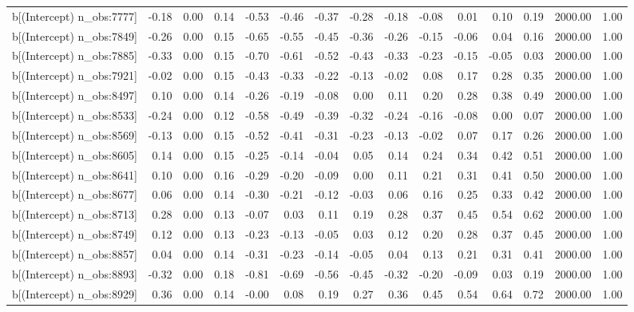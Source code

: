 \begin{table}[ht]
\begin{tabular}{rrrrrrrrrrrrrrr}
  b[(Intercept) n\_obs:7777] & -0.18 & 0.00 & 0.14 & -0.53 & -0.46 & -0.37 & -0.28 & -0.18 & -0.08 & 0.01 & 0.10 & 0.19 & 2000.00 & 1.00 \\ 
  b[(Intercept) n\_obs:7849] & -0.26 & 0.00 & 0.15 & -0.65 & -0.55 & -0.45 & -0.36 & -0.26 & -0.15 & -0.06 & 0.04 & 0.16 & 2000.00 & 1.00 \\ 
  b[(Intercept) n\_obs:7885] & -0.33 & 0.00 & 0.15 & -0.70 & -0.61 & -0.52 & -0.43 & -0.33 & -0.23 & -0.15 & -0.05 & 0.03 & 2000.00 & 1.00 \\ 
  b[(Intercept) n\_obs:7921] & -0.02 & 0.00 & 0.15 & -0.43 & -0.33 & -0.22 & -0.13 & -0.02 & 0.08 & 0.17 & 0.28 & 0.35 & 2000.00 & 1.00 \\ 
  b[(Intercept) n\_obs:8497] & 0.10 & 0.00 & 0.14 & -0.26 & -0.19 & -0.08 & 0.00 & 0.11 & 0.20 & 0.28 & 0.38 & 0.49 & 2000.00 & 1.00 \\ 
  b[(Intercept) n\_obs:8533] & -0.24 & 0.00 & 0.12 & -0.58 & -0.49 & -0.39 & -0.32 & -0.24 & -0.16 & -0.08 & 0.00 & 0.07 & 2000.00 & 1.00 \\ 
  b[(Intercept) n\_obs:8569] & -0.13 & 0.00 & 0.15 & -0.52 & -0.41 & -0.31 & -0.23 & -0.13 & -0.02 & 0.07 & 0.17 & 0.26 & 2000.00 & 1.00 \\ 
  b[(Intercept) n\_obs:8605] & 0.14 & 0.00 & 0.15 & -0.25 & -0.14 & -0.04 & 0.05 & 0.14 & 0.24 & 0.34 & 0.42 & 0.51 & 2000.00 & 1.00 \\ 
  b[(Intercept) n\_obs:8641] & 0.10 & 0.00 & 0.16 & -0.29 & -0.20 & -0.09 & 0.00 & 0.11 & 0.21 & 0.31 & 0.41 & 0.50 & 2000.00 & 1.00 \\ 
  b[(Intercept) n\_obs:8677] & 0.06 & 0.00 & 0.14 & -0.30 & -0.21 & -0.12 & -0.03 & 0.06 & 0.16 & 0.25 & 0.33 & 0.42 & 2000.00 & 1.00 \\ 
  b[(Intercept) n\_obs:8713] & 0.28 & 0.00 & 0.13 & -0.07 & 0.03 & 0.11 & 0.19 & 0.28 & 0.37 & 0.45 & 0.54 & 0.62 & 2000.00 & 1.00 \\ 
  b[(Intercept) n\_obs:8749] & 0.12 & 0.00 & 0.13 & -0.23 & -0.13 & -0.05 & 0.03 & 0.12 & 0.20 & 0.28 & 0.37 & 0.45 & 2000.00 & 1.00 \\ 
  b[(Intercept) n\_obs:8857] & 0.04 & 0.00 & 0.14 & -0.31 & -0.23 & -0.14 & -0.05 & 0.04 & 0.13 & 0.21 & 0.31 & 0.41 & 2000.00 & 1.00 \\ 
  b[(Intercept) n\_obs:8893] & -0.32 & 0.00 & 0.18 & -0.81 & -0.69 & -0.56 & -0.45 & -0.32 & -0.20 & -0.09 & 0.03 & 0.19 & 2000.00 & 1.00 \\ 
  b[(Intercept) n\_obs:8929] & 0.36 & 0.00 & 0.14 & -0.00 & 0.08 & 0.19 & 0.27 & 0.36 & 0.45 & 0.54 & 0.64 & 0.72 & 2000.00 & 1.00 \\ 

\end{tabular}
\end{table}
